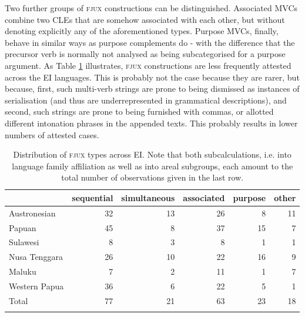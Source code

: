 Two further groups of \textsc{fjux} constructions can be distinguished. Associated MVCs combine two CLEs that are somehow associated with each other, but without denoting explicitly any of the aforementioned types. Purpose MVCs, finally, behave in similar ways as purpose complements do - with the difference that the precursor verb is normally not analysed as being subcategorised for a purpose argument. As Table \ref{table:FJUX_overview} illustrates, \textsc{fjux} constructions are less frequently attested across the EI languages. This is probably not the case because they are rarer, but because, first, such multi-verb strings are prone to being dismissed as instances of serialisation (and thus are underrepresented in grammatical descriptions), and second, such strings are prone to being furnished with commas, or allotted different intonation phrases in the appended texts. This probably results in lower numbers of attested cases.

\begin{table}
\begin{tabular}{lrrrrr}
  \lsptoprule
 & {sequential} & {simultaneous} & {associated} & {purpose} & {other} \\  
  \hline
  Austronesian & 32 & 13 & 26 & 8 & 11 \tabularnewline
  Papuan & 45 & 8 & 37 &  15 & 7 \tabularnewline
   \hline
  Sulawesi & 8 & 3 & 8 & 1 & 1 \tabularnewline
  Nusa Tenggara & 26 & 10 & 22 & 16 & 9 \tabularnewline
  Maluku & 7 & 2 & 11 & 1 & 7 \tabularnewline 
  Western Papua & 36 & 6 & 22 & 5 & 1 \tabularnewline 
\lsptoprule
Total & 77 & 21 & 63 & 23 & 18 \tabularnewline
\lspbottomrule
\end{tabular}
\caption[Distribution of \textsc{fjux} types across EI]{Distribution of \textsc{fjux} types across EI. Note that both subcalculations, i.e. into language family affiliation as well as into areal subgroups, each amount to the total number of observations given in the last row.}
\label{table:FJUX_overview}
\end{table}


